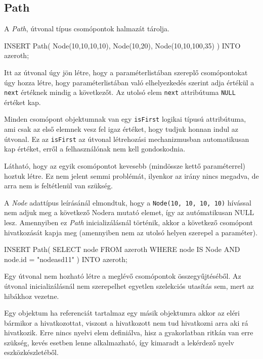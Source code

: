 \subsection{Path}

A \textit{Path}, útvonal típus csomópontok halmazát tárolja.

\begin{sql}
INSERT Path(
    Node(10,10,10,10),
    Node(10,20),
    Node(10,10,100,35)
) INTO azeroth;
\end{sql}

Itt az útvonal úgy jön létre, hogy a paraméterlistában szereplő csomópontokat úgy hozza létre, hogy paraméterlistában való elhelyezkedés szerint adja értékül a \texttt{next} értéknek mindig a következőt. Az utolsó elem \texttt{next} attribútuma \texttt{NULL} értéket kap.

Minden csomópont objektumnak van egy \texttt{isFirst} logikai típusú attribútuma, ami csak az első elemnek vesz fel igaz értéket, hogy tudjuk honnan indul az útvonal. Ez az \texttt{isFirst} az útvonal létrehozási mechanizmusban automatikusan kap értéket, erről a felhasználónak nem kell gondoskodnia.

Látható, hogy az egyik csomópontot kevesebb (mindössze kettő paraméterrel) hoztuk létre. Ez nem jelent semmi problémát, ilyenkor az irány nincs megadva, de arra nem is feltétlenül van szükség.

A \textit{Node} adattípus leírásánál elmondtuk, hogy a \texttt{Node(10, 10, 10, 10)} hívással nem adjuk meg a következő Nodera mutató elemet, így az autómatikusan NULL lesz. Amennyiben ez  \textit{Path} inicializálásnál történik, akkor a következő csomópont hivatkozását kapja meg (amennyiben nem az utolsó helyen szerepel a paraméter).

\begin{sql}
INSERT Path(
    SELECT node FROM azeroth
    WHERE node IS Node AND node.id = "nodeasd11"
) INTO azeroth;
\end{sql}

Egy útvonal nem hozható létre a meglévő csomópontok összegyűjtéséből. Az útvonal inicializálásnál nem szerepelhet egyetlen szelekciós utasítás sem, mert az hibákhoz vezetne.

Egy objektum ha referenciát tartalmaz egy másik objektumra akkor az eléri bármikor a hivatkozottat, viszont a hivatkozott nem tud hivatkozni arra aki rá hivatkozik. Erre nincs nyelvi elem definiálva, hisz a gyakorlatban ritkán van erre szükség, kevés esetben lenne alkalmazható, így kimaradt a lekérdező nyelv eszközkészletéből.


